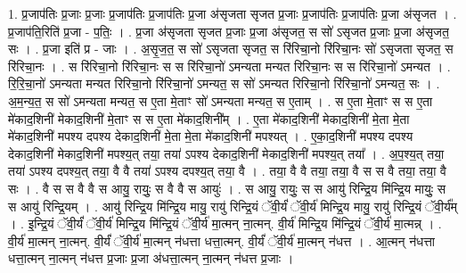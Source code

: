 \documentclass[17pt]{extarticle}
\begin{document}
1. प्र॒जाप॑तिः प्र॒जाः प्र॒जाः प्र॒जाप॑तिः प्र॒जाप॑तिः प्र॒जा अ॑सृजता सृजत प्र॒जाः प्र॒जाप॑तिः प्र॒जाप॑तिः प्र॒जा अ॑सृजत । . प्र॒जाप॑ति॒रिति॑ प्र॒जा - प॒तिः॒ । . प्र॒जा अ॑सृजता सृजत प्र॒जाः प्र॒जा अ॑सृजत॒ स सो॑ ऽसृजत प्र॒जाः प्र॒जा अ॑सृजत॒ सः । . प्र॒जा इति॑ प्र - जाः । . अ॒सृ॒ज॒त॒ स सो॑ ऽसृजता सृजत॒ स रि॑रिचा॒नो रि॑रिचा॒नः सो॑ ऽसृजता सृजत॒ स रि॑रिचा॒नः । . स रि॑रिचा॒नो रि॑रिचा॒नः स स रि॑रिचा॒नो॑ ऽमन्यता मन्यत रिरिचा॒नः स स रि॑रिचा॒नो॑ ऽमन्यत । . रि॒रि॒चा॒नो॑ ऽमन्यता मन्यत रिरिचा॒नो रि॑रिचा॒नो॑ ऽमन्यत॒ स सो॑ ऽमन्यत रिरिचा॒नो रि॑रिचा॒नो॑ ऽमन्यत॒ सः । . अ॒म॒न्य॒त॒ स सो॑ ऽमन्यता मन्यत॒ स ए॒ता मे॒ताꣳ सो॑ ऽमन्यता मन्यत॒ स ए॒ताम् । . स ए॒ता मे॒ताꣳ स स ए॒ता मे॑काद॒शिनी॑ मेकाद॒शिनी॑ मे॒ताꣳ स स ए॒ता मे॑काद॒शिनी᳚म् । . ए॒ता मे॑काद॒शिनी॑ मेकाद॒शिनी॑ मे॒ता मे॒ता मे॑काद॒शिनी॑ मपश्य दपश्य देकाद॒शिनी॑ मे॒ता मे॒ता मे॑काद॒शिनी॑ मपश्यत् । . ए॒का॒द॒शिनी॑ मपश्य दपश्य देकाद॒शिनी॑ मेकाद॒शिनी॑ मपश्य॒त् तया॒ तया॑ ऽपश्य देकाद॒शिनी॑ मेकाद॒शिनी॑ मपश्य॒त् तया᳚ । . अ॒प॒श्य॒त् तया॒ तया॑ ऽपश्य दपश्य॒त् तया॒ वै वै तया॑ ऽपश्य दपश्य॒त् तया॒ वै । . तया॒ वै वै तया॒ तया॒ वै स स वै तया॒ तया॒ वै सः । . वै स स वै वै स आयु॒ रायुः॒ स वै वै स आयुः॑ । . स आयु॒ रायुः॒ स स आयु॑ रिन्द्रि॒य मि॑न्द्रि॒य मायुः॒ स स आयु॑ रिन्द्रि॒यम् । . आयु॑ रिन्द्रि॒य मि॑न्द्रि॒य मायु॒ रायु॑ रिन्द्रि॒यं ॅवी॒र्यं॑ ॅवी॒र्य॑ मिन्द्रि॒य मायु॒ रायु॑ रिन्द्रि॒यं ॅवी॒र्य᳚म् । . इ॒न्द्रि॒यं ॅवी॒र्यं॑ ॅवी॒र्य॑ मिन्द्रि॒य मि॑न्द्रि॒यं ॅवी॒र्य॑ मा॒त्मन् ना॒त्मन्. वी॒र्य॑ मिन्द्रि॒य मि॑न्द्रि॒यं ॅवी॒र्य॑ मा॒त्मन्न् । . वी॒र्य॑ मा॒त्मन् ना॒त्मन्. वी॒र्यं॑ ॅवी॒र्य॑ मा॒त्मन् न॑धत्ता धत्ता॒त्मन्. वी॒र्यं॑ ॅवी॒र्य॑ मा॒त्मन् न॑धत्त । . आ॒त्मन् न॑धत्ता धत्ता॒त्मन् ना॒त्मन् न॑धत्त प्र॒जाः प्र॒जा अ॑धत्ता॒त्मन् ना॒त्मन् न॑धत्त प्र॒जाः । \newline
\end{document}
